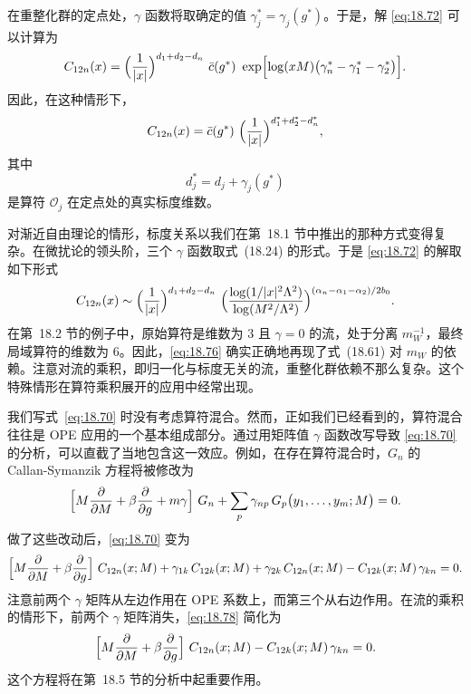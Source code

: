 在重整化群的定点处，$\gamma$ 函数将取确定的值 $\gamma_j^{*} = \gamma_j(g^{*})$。于是，解 \eqref{eq:18.72} 可以计算为
\begin{equation}
  C_{12n}(x) = \Bigl( \frac{1}{|x|} \Bigr)^{d_1+d_2-d_n}\ \bar{c}(g^{*})\
    \exp\Bigl[ \log(xM)\bigl( \gamma_n^{*} - \gamma_1^{*} - \gamma_2^{*}
      \bigr) \Bigr] .
  \label{eq:18.73}
\end{equation}
因此，在这种情形下，
\begin{equation}
  C_{12n}(x) = \bar{c}(g^{*})\ \Bigl( \frac{1}{|x|} \Bigr)^{d_1^{*}+d_2^{*}
    - d_n^{*}} ,
  \label{eq:18.74}
\end{equation}
其中
\begin{equation}
  d_j^{*} = d_j + \gamma_j(g^{*})
  \label{eq:18.75}
\end{equation}
是算符 $\mathcal{O}_j$ 在定点处的真实标度维数。

对渐近自由理论的情形，标度关系以我们在第~18.1 节中推出的那种方式变得复杂。在微扰论的领头阶，三个 $\gamma$ 函数取式~(18.24) 的形式。于是 \eqref{eq:18.72} 的解取如下形式
\begin{equation}
  C_{12n}(x) \sim \Bigl( \frac{1}{|x|} \Bigr)^{d_1+d_2-d_n}\ \Bigl(
    \frac{\log(1/|x|^2\Lambda^2)}{\log(M^2/\Lambda^2)} \Bigr)^{
      (\alpha_n-\alpha_1-\alpha_2)/2b_0} .
  \label{eq:18.76}
\end{equation}
在第~18.2 节的例子中，原始算符是维数为 3 且 $\gamma = 0$ 的流，处于分离 $m_W^{-1}$，最终局域算符的维数为 6。因此，\eqref{eq:18.76} 确实正确地再现了式~(18.61) 对 $m_W$ 的依赖。注意对流的乘积，即归一化与标度无关的流，重整化群依赖不那么复杂。这个特殊情形在算符乘积展开的应用中经常出现。

我们写式~\eqref{eq:18.70} 时没有考虑算符混合。然而，正如我们已经看到的，算符混合往往是 OPE 应用的一个基本组成部分。通过用矩阵值 $\gamma$ 函数改写导致 \eqref{eq:18.70} 的分析，可以直截了当地包含这一效应。例如，在存在算符混合时，$G_n$ 的 Callan-Symanzik 方程将被修改为
\begin{equation}
  \Bigl[ M\frac{\partial}{\partial M} + \beta\frac{\partial}{\partial g}
    + m\gamma \Bigr]\ G_n + \sum_p \gamma_{np}\,G_p\bigl( y_1, \ldots, y_m; M
    \bigr) = 0 .
  \label{eq:18.77}
\end{equation}
做了这些改动后，\eqref{eq:18.70} 变为
\begin{equation}
  \Bigl[ M\frac{\partial}{\partial M} + \beta\frac{\partial}{\partial g}
    \Bigr]\ C_{12n}(x; M) + \gamma_{1k}\,C_{12k}(x; M)
    + \gamma_{2k}\,C_{12n}(x; M) - C_{12k}(x; M)\,\gamma_{kn} = 0 .
  \label{eq:18.78}
\end{equation}
注意前两个 $\gamma$ 矩阵从左边作用在 OPE 系数上，而第三个从右边作用。在流的乘积的情形下，前两个 $\gamma$ 矩阵消失，\eqref{eq:18.78} 简化为
\begin{equation}
  \Bigl[ M\frac{\partial}{\partial M} + \beta\frac{\partial}{\partial g}
    \Bigr]\ C_{12n}(x; M) - C_{12k}(x; M)\,\gamma_{kn} = 0 .
  \label{eq:18.79}
\end{equation}
这个方程将在第~18.5 节的分析中起重要作用。

